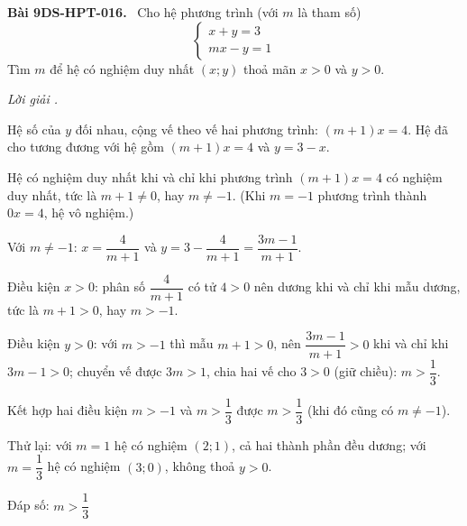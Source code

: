 \documentclass[12pt,a4paper]{article}
\newenvironment{problem}[1][]{\par\medskip\noindent\textbf{Bài #1.}\ }{\par}
\newenvironment{solution}[1][]{\par\noindent\textit{Lời giải #1.}\par}{\par}
\begin{document}
\begin{problem}[9DS-HPT-016]
Cho hệ phương trình (với $m$ là tham số)
\[ \begin{cases} x + y = 3 \\ mx - y = 1 \end{cases} \]
Tìm $m$ để hệ có nghiệm duy nhất $(x; y)$ thoả mãn $x > 0$ và $y > 0$.

\begin{solution}
Hệ số của $y$ đối nhau, cộng vế theo vế hai phương trình: $(m + 1)x = 4$. Hệ đã cho tương đương với hệ gồm $(m + 1)x = 4$ và $y = 3 - x$.

Hệ có nghiệm duy nhất khi và chỉ khi phương trình $(m + 1)x = 4$ có nghiệm duy nhất, tức là $m + 1 \neq 0$, hay $m \neq -1$. (Khi $m = -1$ phương trình thành $0x = 4$, hệ vô nghiệm.)

Với $m \neq -1$: $x = \dfrac{4}{m + 1}$ và $y = 3 - \dfrac{4}{m + 1} = \dfrac{3m - 1}{m + 1}$.

Điều kiện $x > 0$: phân số $\dfrac{4}{m + 1}$ có tử $4 > 0$ nên dương khi và chỉ khi mẫu dương, tức là $m + 1 > 0$, hay $m > -1$.

Điều kiện $y > 0$: với $m > -1$ thì mẫu $m + 1 > 0$, nên $\dfrac{3m - 1}{m + 1} > 0$ khi và chỉ khi $3m - 1 > 0$; chuyển vế được $3m > 1$, chia hai vế cho $3 > 0$ (giữ chiều): $m > \dfrac{1}{3}$.

Kết hợp hai điều kiện $m > -1$ và $m > \dfrac{1}{3}$ được $m > \dfrac{1}{3}$ (khi đó cũng có $m \neq -1$).

Thử lại: với $m = 1$ hệ có nghiệm $(2; 1)$, cả hai thành phần đều dương; với $m = \dfrac{1}{3}$ hệ có nghiệm $(3; 0)$, không thoả $y > 0$.

Đáp số: $\boxed{m > \dfrac{1}{3}}$
\end{solution}
\end{problem}
\end{document}
